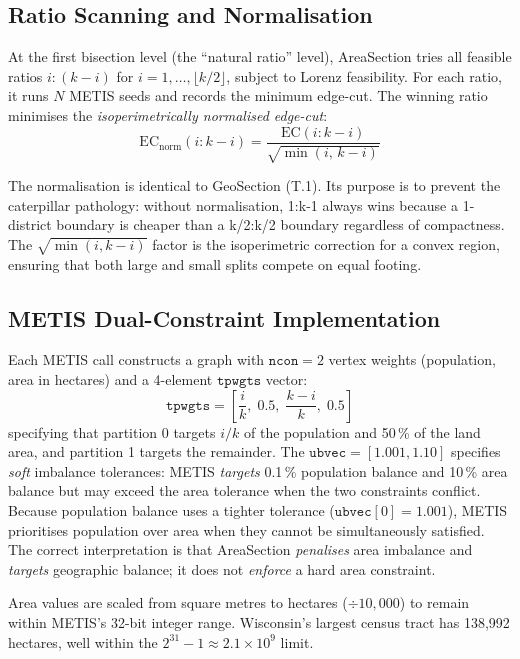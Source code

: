 \subsection{Ratio Scanning and Normalisation}

At the first bisection level (the ``natural ratio'' level), AreaSection tries
all feasible ratios $i:(k-i)$ for $i = 1, \ldots, \lfloor k/2 \rfloor$,
subject to Lorenz feasibility.
For each ratio, it runs $N$ METIS seeds and records the minimum edge-cut.
The winning ratio minimises the \emph{isoperimetrically normalised edge-cut}:
\[
  \mathrm{EC}_{\text{norm}}(i:k-i) = \frac{\mathrm{EC}(i:k-i)}{\sqrt{\min(i,\, k-i)}}
\]

The normalisation is identical to GeoSection (T.1).
Its purpose is to prevent the caterpillar pathology: without normalisation,
1:k-1 always wins because a 1-district boundary is cheaper than a k/2:k/2
boundary regardless of compactness.
The $\sqrt{\min(i,k-i)}$ factor is the isoperimetric correction for a convex
region, ensuring that both large and small splits compete on equal footing.

\subsection{METIS Dual-Constraint Implementation}

Each METIS call constructs a graph with $\mathtt{ncon}=2$ vertex weights
(population, area in hectares) and a 4-element $\mathtt{tpwgts}$ vector:
\[
  \mathtt{tpwgts} = \left[\frac{i}{k},\; 0.5,\; \frac{k-i}{k},\; 0.5\right]
\]
specifying that partition 0 targets $i/k$ of the population and 50\,\% of
the land area, and partition 1 targets the remainder.
The $\mathtt{ubvec} = [1.001, 1.10]$ specifies \emph{soft} imbalance tolerances:
METIS \emph{targets} 0.1\,\% population balance and 10\,\% area balance but may
exceed the area tolerance when the two constraints conflict.
Because population balance uses a tighter tolerance ($\mathtt{ubvec}[0] = 1.001$),
METIS prioritises population over area when they cannot be simultaneously
satisfied.
The correct interpretation is that AreaSection \emph{penalises} area imbalance
and \emph{targets} geographic balance; it does not \emph{enforce} a hard area
constraint.

Area values are scaled from square metres to hectares ($\div 10{,}000$) to
remain within METIS's 32-bit integer range.
Wisconsin's largest census tract has 138{,}992 hectares, well within the
$2^{31} - 1 \approx 2.1 \times 10^9$ limit.

